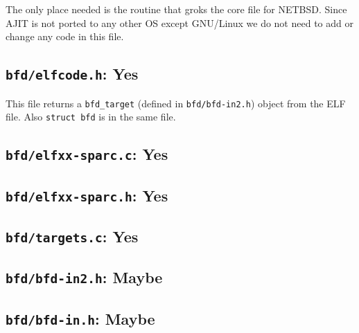 The only  place needed  is the  routine that groks  the core  file for
NETBSD.  Since AJIT is not ported  to any other OS except GNU/Linux we
do not need to add or change any code in this file.

\subsection{\texttt{bfd/elfcode.h}: Yes}
\label{sec:bfd:elfcode.h}

This    file    returns    a    \texttt{bfd\_target}    (defined    in
\texttt{bfd/bfd-in2.h}) object from the ELF file.  Also \texttt{struct
  bfd} is in the same file.





\subsection{\texttt{bfd/elfxx-sparc.c}: Yes}
\label{sec:bfd:elfxx-sparc.c}


\subsection{\texttt{bfd/elfxx-sparc.h}: Yes}
\label{sec:bfd:elfxx-sparc.h}


\subsection{\texttt{bfd/targets.c}: Yes}
\label{sec:bfd:targets.c}


\subsection{\texttt{bfd/bfd-in2.h}: Maybe}
\label{sec:bfd:bfd-in2.h}


\subsection{\texttt{bfd/bfd-in.h}: Maybe}
\label{sec:bfd:bfd-in.h}


